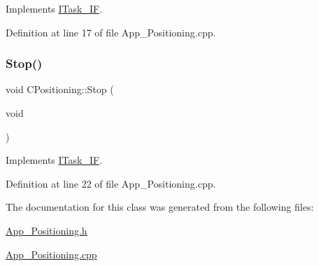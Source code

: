 Implements \mbox{\hyperlink{class_i_task___i_f_ab73cc5879a61d00fc59b72cce32cc6f7}{I\+Task\+\_\+\+IF}}.



Definition at line 17 of file App\+\_\+\+Positioning.\+cpp.

\mbox{\label{class_c_positioning_a2706c9bb6bb52201c279386fd2c9dd89}} 
\subsubsection{\texorpdfstring{Stop()}{Stop()}}
{\footnotesize\ttfamily void C\+Positioning\+::\+Stop (\begin{DoxyParamCaption}\item[{void}]{ }\end{DoxyParamCaption})\hspace{0.3cm}{\ttfamily [virtual]}}



Implements \mbox{\hyperlink{class_i_task___i_f_af5f8fba86704c7e36d0e4681d58300c6}{I\+Task\+\_\+\+IF}}.



Definition at line 22 of file App\+\_\+\+Positioning.\+cpp.



The documentation for this class was generated from the following files\+:\begin{DoxyCompactItemize}
\item 
\mbox{\hyperlink{_app___positioning_8h}{App\+\_\+\+Positioning.\+h}}\item 
\mbox{\hyperlink{_app___positioning_8cpp}{App\+\_\+\+Positioning.\+cpp}}\end{DoxyCompactItemize}
